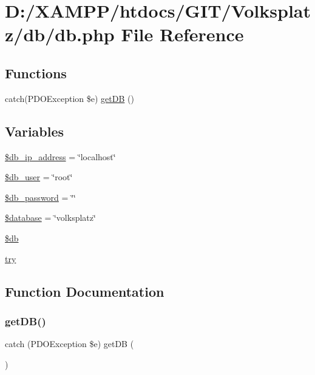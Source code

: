 \hypertarget{db_8php}{}\section{D\+:/\+X\+A\+M\+P\+P/htdocs/\+G\+I\+T/\+Volksplatz/db/db.php File Reference}
\label{db_8php}
\subsection*{Functions}
\begin{DoxyCompactItemize}
\item 
catch(P\+D\+O\+Exception \$e) \mbox{\hyperlink{db_8php_af2d378e5cc400f87ff7c02e698d518fd}{get\+DB}} ()
\end{DoxyCompactItemize}
\subsection*{Variables}
\begin{DoxyCompactItemize}
\item 
\mbox{\hyperlink{db_8php_af43570666274607643a164642186da21}{\$db\+\_\+ip\+\_\+address}} = \char`\"{}localhost\char`\"{}
\item 
\mbox{\hyperlink{db_8php_a6a2ff59abacecba75a151826de414a27}{\$db\+\_\+user}} = \char`\"{}root\char`\"{}
\item 
\mbox{\hyperlink{db_8php_a2962c2bda65ca19dd4dd12d7160f1bf8}{\$db\+\_\+password}} = \char`\"{}\char`\"{}
\item 
\mbox{\hyperlink{db_8php_a7691c0162d89de0b6ba47edcd8ba8878}{\$database}} = \char`\"{}volksplatz\char`\"{}
\item 
\mbox{\hyperlink{db_8php_a1fa3127fc82f96b1436d871ef02be319}{\$db}}
\item 
\mbox{\hyperlink{db_8php_abe4cc9788f52e49485473dc699537388}{try}}
\end{DoxyCompactItemize}


\subsection{Function Documentation}
\mbox{\label{db_8php_af2d378e5cc400f87ff7c02e698d518fd}} 
\subsubsection{\texorpdfstring{getDB()}{getDB()}}
{\footnotesize\ttfamily catch (P\+D\+O\+Exception \$e) get\+DB (\begin{DoxyParamCaption}{ }\end{DoxyParamCaption})}



